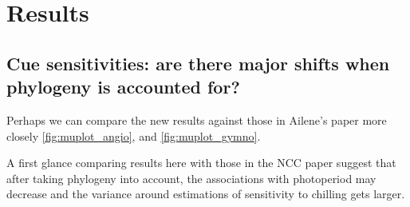 \documentclass{article}\usepackage[]{graphicx}\usepackage[]{color}
\begin{document}

\section*{Results}


\subsection*{Cue sensitivities: are there major shifts when phylogeny is accounted for?}

\item Perhaps we can compare the new results against those in Ailene's paper more closely \ref{fig:muplot_angio}, and \ref{fig:muplot_gymno}.

\item A first glance comparing results here with those in the NCC paper suggest that after taking phylogeny into account, the associations with photoperiod may decrease and the variance around estimations of sensitivity to chilling gets larger.
\end{document}
